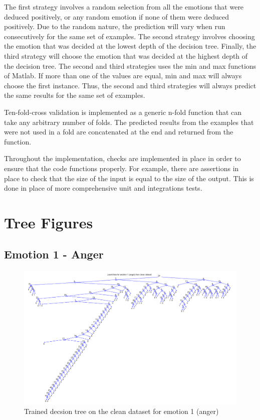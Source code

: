 \documentclass[a4paper]{article}
\begin{document}
The first strategy involves a random selection from all the emotions that were deduced positively, or any random emotion if none of them were deduced positively. Due to the random nature, the prediction will vary when run consecutively for the same set of examples. The second strategy involves choosing the emotion that was decided at the lowest depth of the decision tree. Finally, the third strategy will choose the emotion that was decided at the highest depth of the decision tree. The second and third strategies uses the min and max functions of Matlab. If more than one of the values are equal,  min and max will always choose the first instance. Thus, the second and third strategies will always predict the same results for the same set of examples.\medskip

Ten-fold-cross validation is implemented as a generic n-fold function that can take any arbitrary number of folds. The predicted results from the examples that were not used in a fold are concatenated at the end and returned from the function.\medskip

Throughout the implementation, checks are implemented in place in order to ensure that the code functions properly. For example, there are assertions in place to check that the size of the input is equal to the size of the output. This is done in place of more comprehensive unit and integrations tests.

\clearpage


\section{Tree Figures}

\subsection{Emotion 1 - Anger}
\begin{figure}[H]
\center
\includegraphics[width=0.9\columnwidth]{AngerTree} %
\caption{Trained decsion tree on the clean dataset for emotion 1 (anger)}
\end{figure}
\end{document}
